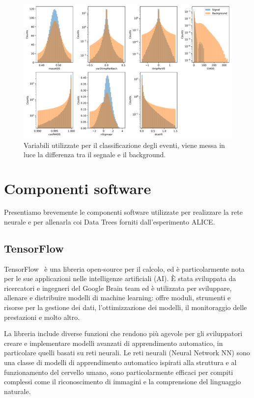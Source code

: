     \begin{figure}[p]
        \centering
        \includegraphics[width=1\linewidth]{res/fig/3-chapter/2-vars-histogram.pdf}
        \caption{Variabili utilizzate per il classificazione degli eventi, viene messa in luce la differenza tra il segnale e il background.}
        \label{fig:3-2-vars-histogram}
    \end{figure}

\clearpage

\section{Componenti software}
    Presentiamo brevemente le componenti software utilizzate per realizzare la rete neurale e per allenarla coi Data Trees forniti dall’esperimento ALICE.

    \subsection{TensorFlow}
        TensorFlow~\cite{TensorFlow} è una libreria open-source per il calcolo, ed è particolarmente nota per le sue applicazioni nelle intelligenze artificiali (AI). È stata sviluppata da ricercatori e ingegneri del Google Brain team ed è utilizzata per sviluppare, allenare e distribuire modelli di machine learning: offre moduli, strumenti e risorse per la gestione dei dati, l’ottimizzazione dei modelli, il monitoraggio delle prestazioni e molto altro.

        La libreria include diverse funzioni che rendono più agevole per gli sviluppatori creare e implementare modelli avanzati di apprendimento automatico, in particolare quelli basati su reti neurali. Le reti neurali (Neural Network NN) sono una classe di modelli di apprendimento automatico ispirati alla struttura e al funzionamento del cervello umano, sono particolarmente efficaci per compiti complessi come il riconoscimento di immagini e la comprensione del linguaggio naturale.

